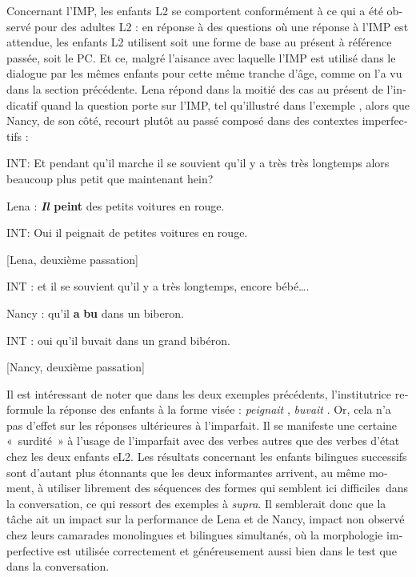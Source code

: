 \documentclass[french, output=paper]{langscibook}
\begin{document}
\begin{otherlanguage}{french}
Concernant l’IMP, les enfants L2 se comportent conformément à ce qui a été observé pour des adultes L2 : en réponse à des questions où une réponse à l’IMP est attendue, les enfants L2 utilisent soit une forme de base au présent à référence passée, soit le PC. Et ce, malgré l’aisance avec laquelle l’IMP est utilisé dans le dialogue par les mêmes enfants pour cette même tranche d’âge, comme on l’a vu dans la section précédente. Lena répond dans la moitié des cas au présent de l’indicatif quand la question porte sur l’IMP, tel qu’illustré dans l’exemple , alors que Nancy, de son côté, recourt plutôt au passé composé dans des contextes imper\-fectifs  :


\ea%
    \label{ex:kihlstedt:5}
    INT: Et pendant qu’il marche il se souvient qu’il y a très très longtemps alors beaucoup plus petit que maintenant hein?

Lena : \textbf{\textit{Il} \textbf{peint} }des petits voitures en rouge.

INT: Oui il peignait de petites voitures en rouge. 

\hfill[Lena, deuxième passation]
\z

\ea%
    \label{ex:kihlstedt:6}
 INT : et il se souvient qu’il y a très longtemps, encore bébé….  

  Nancy : qu’il \textbf{a} \textbf{bu} dans un biberon.

  INT : oui qu’il buvait dans un grand bibéron. 
  
  \hfill[Nancy, deuxième passation]
\z


Il est intéressant de noter que dans les deux exemples précédents, l’institutrice reformule la réponse des enfants à la forme visée : \textit{peignait} , \textit{buvait} . Or, cela n’a pas d’effet sur les réponses ultérieures à l’imparfait. Il se manifeste une certaine «~surdité~» à l’usage de l’imparfait avec des verbes autres que des verbes d’état chez les deux enfants eL2. Les résultats concernant les enfants bilingues successifs sont d’autant plus étonnants que les deux informantes arrivent, au même moment, à utiliser librement des séquences des formes qui semblent ici difficiles~dans la conversation, ce qui ressort des exemples  à  \textit{supra}. Il semblerait donc que la tâche ait un impact sur la performance de Lena et de Nancy, impact non observé chez leurs camarades monolingues et bilingues simultanés, où la morphologie imperfective est utilisée correctement et généreusement aussi bien dans le test que dans la conversation.



\end{otherlanguage}
\end{document}
